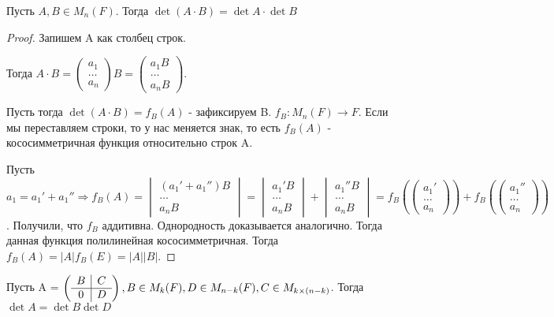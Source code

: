 \begin{theorem}
	Пусть \(A,B \in M_{n}(F)\). Тогда \(\det (A\cdot B) = \det A \cdot \det B\)
\end{theorem}
\begin{proof}
	Запишем A как столбец строк. 
	
	Тогда \(A\cdot B = \begin{pmatrix}
	a_1 \\ \ldots \\ a_n
	\end{pmatrix}B = \begin{pmatrix}
	a_1 B \\ 
	\ldots \\ a_n B
	\end{pmatrix}\). 
	
	Пусть тогда \(\det(A\cdot B) = f_B(A)\) - зафиксируем B. \(f_B:M_n(F)\to F\). 
	Если мы переставляем строки, то у нас меняется знак, то есть \(f_B(A)\) - кососимметричная функция относительно строк A. 
	
	Пусть \(a_1 = a_1' + a_1'' \Longrightarrow f_B(A) = \begin{vmatrix}
	(a_1'+a_1'')B \\ \ldots \\ a_nB
	\end{vmatrix} = \begin{vmatrix}
	a_1'B \\ \ldots \\ a_nB
\end{vmatrix} + \begin{vmatrix}
a_1'' B \\ \ldots \\ a_nB
\end{vmatrix} = f_B(\begin{pmatrix}
a_1' \\ \ldots \\ a_n
\end{pmatrix})+f_B(\begin{pmatrix}
a_1'' \\ \ldots \\ a_n
\end{pmatrix})\). Получили, что $f_B$ аддитивна. Однородность доказывается аналогично. Тогда данная функция полилинейная кососимметричная. Тогда \(f_B(A) = |A|f_B(E) = |A||B|\).
\end{proof}
\begin{theorem}
	Пусть A = \(\left(\begin{array}{c | c}
		B & C \\\hline 
		0 & D
	\end{array}\right), B \in M_k(F), D\in M_{n-k}(F), C \in M_{k\times (n-k)}\). Тогда \(\det A = \det B \det D\)
\end{theorem}
